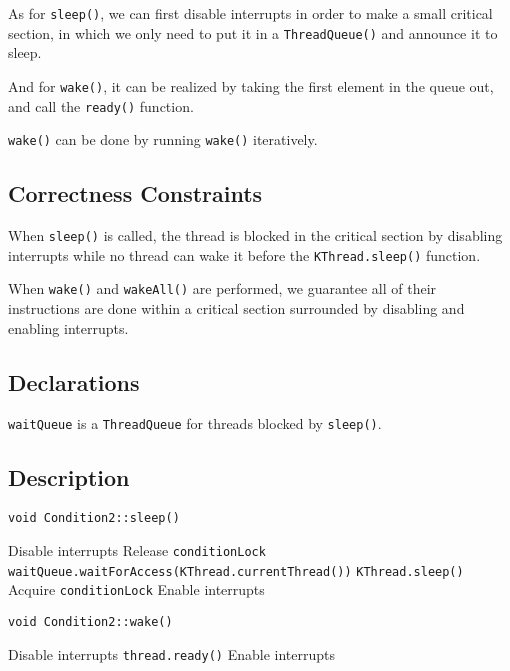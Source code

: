 \documentclass{article}
\begin{document}
\begin{spacing}{1.1}
    As for \texttt{sleep()}, we can first disable interrupts in order to make a small critical section, in which we only need to put it in a \texttt{ThreadQueue()} and announce it to sleep.

    And for \texttt{wake()}, it can be realized by taking the first element in the queue out, and call the \texttt{ready()} function.

    \texttt{wake()} can be done by running \texttt{wake()} iteratively.
    \subsection{Correctness Constraints}
    \begin{asparaitem}
    \item When \texttt{sleep()} is called, the thread is blocked in the critical section by disabling interrupts while no thread can wake it before the \texttt{KThread.sleep()} function.
    \item When \texttt{wake()} and \texttt{wakeAll()} are performed, we guarantee all of their instructions are done within a critical section surrounded by disabling and enabling interrupts.
    \end{asparaitem}
    \subsection{Declarations}
    \texttt{waitQueue} is a \texttt{ThreadQueue} for threads blocked by \texttt{sleep()}.
    \subsection{Description}
    \begin{algorithm}
      \caption{ \texttt{void Condition2::sleep()}}
      \begin{algorithmic}
	\STATE Disable interrupts
	\STATE Release \texttt{conditionLock}
	\STATE \texttt{waitQueue.waitForAccess(KThread.currentThread())}
	\STATE	\texttt{KThread.sleep()}
	\STATE Acquire \texttt{conditionLock}
	\STATE Enable interrupts
      \end{algorithmic}
    \end{algorithm}

    \begin{algorithm}
      \caption{ \texttt{void Condition2::wake()}}
      \begin{algorithmic}
	\STATE Disable interrupts
	\STATE \texttt{thread.ready()}
	\ENDIF
	\STATE Enable interrupts
      \end{algorithmic}
    \end{algorithm}


\end{spacing}
\end{document}
